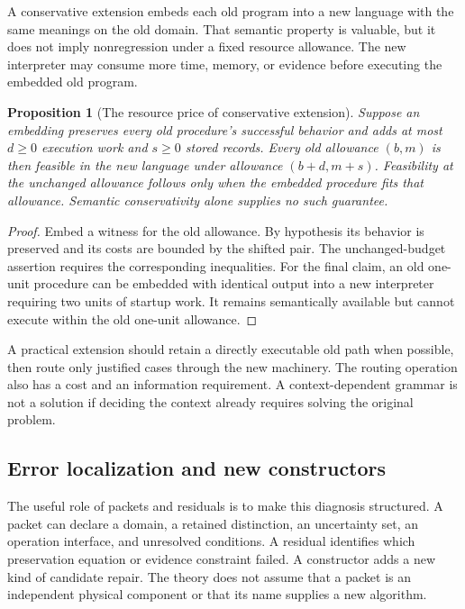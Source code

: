 \documentclass[11pt,letterpaper]{article}
\theoremstyle{plain}
\newtheorem{proposition}[theorem]{Proposition}
\theoremstyle{definition}
\begin{document}
A conservative extension embeds each old program into a new language with the same meanings on the old domain. That semantic property is valuable, but it does not imply nonregression under a fixed resource allowance. The new interpreter may consume more time, memory, or evidence before executing the embedded old program.

\begin{proposition}[The resource price of conservative extension]\label{prop:extension}
Suppose an embedding preserves every old procedure's successful behavior and adds at most $d\geq0$ execution work and $s\geq0$ stored records. Every old allowance $(b,m)$ is then feasible in the new language under allowance $(b+d,m+s)$. Feasibility at the unchanged allowance follows only when the embedded procedure fits that allowance. Semantic conservativity alone supplies no such guarantee.
\end{proposition}
\begin{proof}
Embed a witness for the old allowance. By hypothesis its behavior is preserved and its costs are bounded by the shifted pair. The unchanged-budget assertion requires the corresponding inequalities. For the final claim, an old one-unit procedure can be embedded with identical output into a new interpreter requiring two units of startup work. It remains semantically available but cannot execute within the old one-unit allowance.
\end{proof}

A practical extension should retain a directly executable old path when possible, then route only justified cases through the new machinery. The routing operation also has a cost and an information requirement. A context-dependent grammar is not a solution if deciding the context already requires solving the original problem.

\subsection{Error localization and new constructors}
The useful role of packets and residuals is to make this diagnosis structured. A packet can declare a domain, a retained distinction, an uncertainty set, an operation interface, and unresolved conditions. A residual identifies which preservation equation or evidence constraint failed. A constructor adds a new kind of candidate repair. The theory does not assume that a packet is an independent physical component or that its name supplies a new algorithm.
\end{document}
